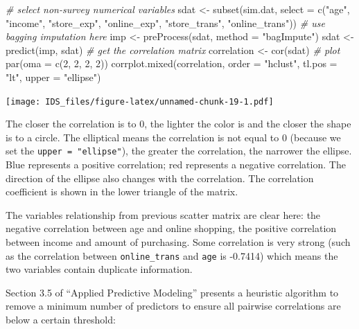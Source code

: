 \documentclass[
  12pt,
]{krantz}
\makeatletter
\newenvironment{Shaded}{\begin{snugshade}}{\end{snugshade}}
\newcommand{\AttributeTok}[1]{\textcolor[rgb]{0.61,0.61,0.61}{#1}}
\newcommand{\CommentTok}[1]{\textcolor[rgb]{0.37,0.37,0.37}{\textit{#1}}}
\newcommand{\DecValTok}[1]{\textcolor[rgb]{0.06,0.06,0.06}{#1}}
\newcommand{\FunctionTok}[1]{\textcolor[rgb]{0,0,0}{#1}}
\newcommand{\NormalTok}[1]{#1}
\newcommand{\OtherTok}[1]{\textcolor[rgb]{0.37,0.37,0.37}{#1}}
\newcommand{\StringTok}[1]{\textcolor[rgb]{0.5,0.5,0.5}{#1}}
\newenvironment{kframe}{%
\medskip{}
\setlength{\fboxsep}{.8em}
 \def\at@end@of@kframe{}%
 \ifinner\ifhmode%
  \def\at@end@of@kframe{\end{minipage}}%
  \begin{minipage}{\columnwidth}%
 \fi\fi%
 \def\FrameCommand##1{\hskip\@totalleftmargin \hskip-\fboxsep
 \colorbox{shadecolor}{##1}\hskip-\fboxsep
     \hskip-\linewidth \hskip-\@totalleftmargin \hskip\columnwidth}%
 \MakeFramed {\advance\hsize-\width
   \@totalleftmargin\z@ \linewidth\hsize
   \@setminipage}}%
 {\par\unskip\endMakeFramed%
 \at@end@of@kframe}
\renewenvironment{Shaded}{\begin{kframe}}{\end{kframe}}
\makeatother
\begin{document}
\begin{Shaded}
\begin{Highlighting}[]
\CommentTok{\# select non{-}survey numerical variables}
\NormalTok{sdat }\OtherTok{\textless{}{-}} \FunctionTok{subset}\NormalTok{(sim.dat, }\AttributeTok{select =} \FunctionTok{c}\NormalTok{(}\StringTok{"age"}\NormalTok{, }\StringTok{"income"}\NormalTok{, }\StringTok{"store\_exp"}\NormalTok{, }
    \StringTok{"online\_exp"}\NormalTok{, }\StringTok{"store\_trans"}\NormalTok{, }\StringTok{"online\_trans"}\NormalTok{))}
\CommentTok{\# use bagging imputation here}
\NormalTok{imp }\OtherTok{\textless{}{-}} \FunctionTok{preProcess}\NormalTok{(sdat, }\AttributeTok{method =} \StringTok{"bagImpute"}\NormalTok{)}
\NormalTok{sdat }\OtherTok{\textless{}{-}} \FunctionTok{predict}\NormalTok{(imp, sdat)}
\CommentTok{\# get the correlation matrix}
\NormalTok{correlation }\OtherTok{\textless{}{-}} \FunctionTok{cor}\NormalTok{(sdat)}
\CommentTok{\# plot}
\FunctionTok{par}\NormalTok{(}\AttributeTok{oma =} \FunctionTok{c}\NormalTok{(}\DecValTok{2}\NormalTok{, }\DecValTok{2}\NormalTok{, }\DecValTok{2}\NormalTok{, }\DecValTok{2}\NormalTok{))}
\FunctionTok{corrplot.mixed}\NormalTok{(correlation, }\AttributeTok{order =} \StringTok{"hclust"}\NormalTok{, }\AttributeTok{tl.pos =} \StringTok{"lt"}\NormalTok{, }
    \AttributeTok{upper =} \StringTok{"ellipse"}\NormalTok{)}
\end{Highlighting}
\end{Shaded}

\texttt{[image: IDS\_files/figure-latex/unnamed-chunk-19-1.pdf]}

The closer the correlation is to 0, the lighter the color is and the closer the shape is to a circle. The elliptical means the correlation is not equal to 0 (because we set the \texttt{upper\ =\ "ellipse"}), the greater the correlation, the narrower the ellipse. Blue represents a positive correlation; red represents a negative correlation. The direction of the ellipse also changes with the correlation. The correlation coefficient is shown in the lower triangle of the matrix.

The variables relationship from previous scatter matrix are clear here: the negative correlation between age and online shopping, the positive correlation between income and amount of purchasing. Some correlation is very strong (such as the correlation between \texttt{online\_trans} and \texttt{age} is -0.7414) which means the two variables contain duplicate information.

Section 3.5 of ``Applied Predictive Modeling'' \citep{APM} presents a heuristic algorithm to remove a minimum number of predictors to ensure all pairwise correlations are below a certain threshold:
\end{document}
